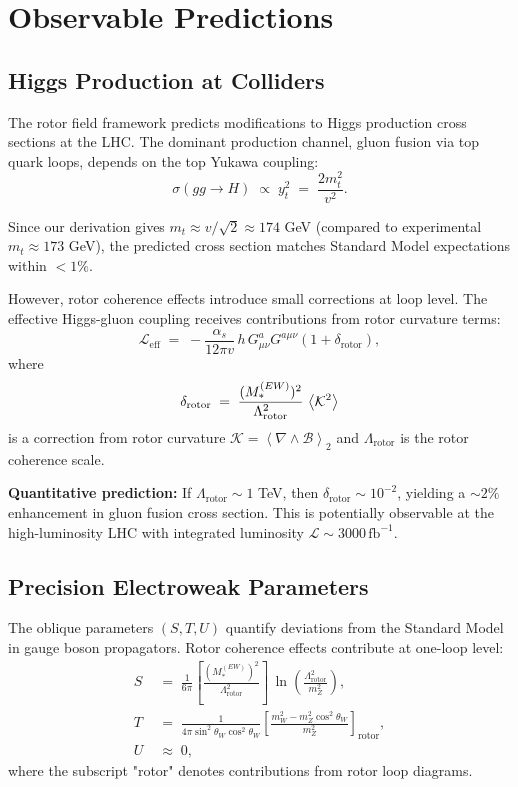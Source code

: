 \documentclass[11pt,a4paper]{article}
\newcommand{\grade}[2]{\left\langle #1 \right\rangle_{#2}}
\newcommand{\biv}[1]{\grade{#1}{2}}
\newcommand{\Biv}{\mathcal{B}}
\newcommand{\D}{\nabla}                        %
\newcommand{\Lag}{\mathcal{L}}
\theoremstyle{definition}
\theoremstyle{plain}
\theoremstyle{remark}
\begin{document}
\section{Observable Predictions}\label{sec:predictions}

\subsection{Higgs Production at Colliders}

The rotor field framework predicts modifications to Higgs production cross sections at the LHC. The dominant production channel, gluon fusion via top quark loops, depends on the top Yukawa coupling:
\begin{equation}
  \sigma(gg \to H) \;\propto\; y_t^2 \;=\; \frac{2m_t^2}{v^2}.
\end{equation}

Since our derivation gives $m_t \approx v/\sqrt{2} \approx 174$ GeV (compared to experimental $m_t \approx 173$ GeV), the predicted cross section matches Standard Model expectations within $<1\%$.

However, rotor coherence effects introduce small corrections at loop level. The effective Higgs-gluon coupling receives contributions from rotor curvature terms:
\begin{equation}
  \Lag_{\text{eff}} \;=\; -\frac{\alpha_s}{12\pi v}\,h\,G_{\mu\nu}^a G^{a\mu\nu}\left(1 + \delta_{\text{rotor}}\right),
\end{equation}
where
\begin{equation}
  \delta_{\text{rotor}} \;=\; \frac{(M_*^{(EW)})^2}{\Lambda_{\text{rotor}}^2}\,\ev{\mathcal{K}^2}
\end{equation}
is a correction from rotor curvature $\mathcal{K} = \biv{\D\wedge\Biv}$ and $\Lambda_{\text{rotor}}$ is the rotor coherence scale.

\textbf{Quantitative prediction:} If $\Lambda_{\text{rotor}} \sim 1$ TeV, then $\delta_{\text{rotor}} \sim 10^{-2}$, yielding a $\sim 2\%$ enhancement in gluon fusion cross section. This is potentially observable at the high-luminosity LHC with integrated luminosity $\mathcal{L} \sim 3000\,\text{fb}^{-1}$.

\subsection{Precision Electroweak Parameters}

The oblique parameters $(S, T, U)$ quantify deviations from the Standard Model in gauge boson propagators. Rotor coherence effects contribute at one-loop level:
\begin{align}
  S &\;=\; \frac{1}{6\pi}\left[\frac{(M_*^{(EW)})^2}{\Lambda_{\text{rotor}}^2}\right]\,\ln\left(\frac{\Lambda_{\text{rotor}}^2}{m_Z^2}\right), \\
  T &\;=\; \frac{1}{4\pi\sin^2\theta_W\cos^2\theta_W}\left[\frac{m_W^2 - m_Z^2\cos^2\theta_W}{m_Z^2}\right]_{\text{rotor}}, \\
  U &\;\approx\; 0,
\end{align}
where the subscript "rotor" denotes contributions from rotor loop diagrams.
\end{document}
